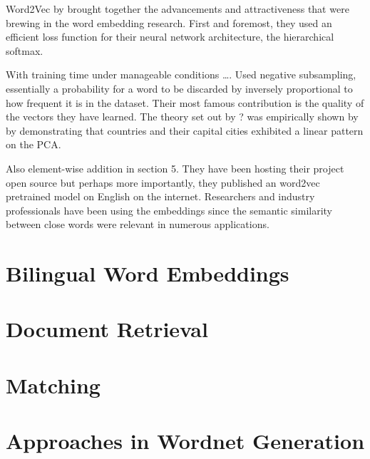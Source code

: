 Word2Vec by \textcite{mikolov_distributed_2013} brought together the advancements and attractiveness that were brewing in the word embedding research.
First and foremost, they used an efficient loss function for their neural network architecture, the hierarchical softmax. %

With training time under manageable conditions \ldots.
Used negative subsampling, essentially a probability for a word to be discarded by inversely proportional to how frequent it is in the dataset.
Their most famous contribution is the quality of the vectors they have learned.
The theory set out by ? was empirically shown by \citeauthor{mikolov_distributed_2013} by demonstrating that countries and their capital cities exhibited a linear pattern on the PCA.

Also element-wise addition in section 5.
They have been hosting their project open source but perhaps more importantly, they published an word2vec pretrained model on English on the internet.
Researchers and industry professionals have been using the embeddings since the semantic similarity between close words were relevant in numerous applications.


\section{Bilingual Word Embeddings}%
\label{sec:bilingual_word_embeddings}

\section{Document Retrieval}%
\label{sec:document_retrieval}

\section{Matching}%
\label{sec:matching}

\section{Approaches in Wordnet Generation}%
\label{sec:approaches_in_wordnet_generation}

